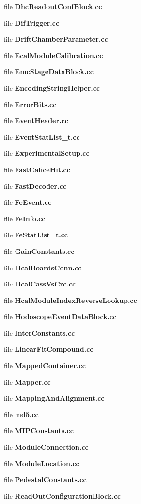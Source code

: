 \begin{DoxyCompactItemize}
\item 
file {\bfseries DhcReadoutConfBlock.cc}
\item 
file {\bfseries DifTrigger.cc}
\item 
file {\bfseries DriftChamberParameter.cc}
\item 
file {\bfseries EcalModuleCalibration.cc}
\item 
file {\bfseries EmcStageDataBlock.cc}
\item 
file {\bfseries EncodingStringHelper.cc}
\item 
file {\bfseries ErrorBits.cc}
\item 
file {\bfseries EventHeader.cc}
\item 
file {\bfseries EventStatList\_\-t.cc}
\item 
file {\bfseries ExperimentalSetup.cc}
\item 
file {\bfseries FastCaliceHit.cc}
\item 
file {\bfseries FastDecoder.cc}
\item 
file {\bfseries FeEvent.cc}
\item 
file {\bfseries FeInfo.cc}
\item 
file {\bfseries FeStatList\_\-t.cc}
\item 
file {\bfseries GainConstants.cc}
\item 
file {\bfseries HcalBoardsConn.cc}
\item 
file {\bfseries HcalCassVsCrc.cc}
\item 
file {\bfseries HcalModuleIndexReverseLookup.cc}
\item 
file {\bfseries HodoscopeEventDataBlock.cc}
\item 
file {\bfseries InterConstants.cc}
\item 
file {\bfseries LinearFitCompound.cc}
\item 
file {\bfseries MappedContainer.cc}
\item 
file {\bfseries Mapper.cc}
\item 
file {\bfseries MappingAndAlignment.cc}
\item 
file {\bfseries md5.cc}
\item 
file {\bfseries MIPConstants.cc}
\item 
file {\bfseries ModuleConnection.cc}
\item 
file {\bfseries ModuleLocation.cc}
\item 
file {\bfseries PedestalConstants.cc}
\item 
file {\bfseries ReadOutConfigurationBlock.cc}
\item 

\end{DoxyCompactItemize}
